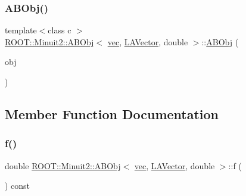 \mbox{\label{classROOT_1_1Minuit2_1_1ABObj_3_01vec_00_01LAVector_00_01double_01_4_aeb6018846b4e8252a64eb21db982fe96}} 
\subsubsection{\texorpdfstring{ABObj()}{ABObj()}\hspace{0.1cm}{\footnotesize\ttfamily [6/6]}}
{\footnotesize\ttfamily template$<$class c $>$ \\
\mbox{\hyperlink{classROOT_1_1Minuit2_1_1ABObj}{R\+O\+O\+T\+::\+Minuit2\+::\+A\+B\+Obj}}$<$ \mbox{\hyperlink{classROOT_1_1Minuit2_1_1vec}{vec}}, \mbox{\hyperlink{classROOT_1_1Minuit2_1_1LAVector}{L\+A\+Vector}}, double $>$\+::\mbox{\hyperlink{classROOT_1_1Minuit2_1_1ABObj}{A\+B\+Obj}} (\begin{DoxyParamCaption}\item[{const \mbox{\hyperlink{classROOT_1_1Minuit2_1_1ABObj}{A\+B\+Obj}}$<$ \mbox{\hyperlink{classROOT_1_1Minuit2_1_1vec}{vec}}, \mbox{\hyperlink{classROOT_1_1Minuit2_1_1LAVector}{L\+A\+Vector}}, c $>$ \&}]{obj }\end{DoxyParamCaption})\hspace{0.3cm}{\ttfamily [inline]}}



\subsection{Member Function Documentation}
\mbox{\label{classROOT_1_1Minuit2_1_1ABObj_3_01vec_00_01LAVector_00_01double_01_4_a418f4c2409e7afb1804e3033a7aed2fd}} 
\subsubsection{\texorpdfstring{f()}{f()}\hspace{0.1cm}{\footnotesize\ttfamily [1/2]}}
{\footnotesize\ttfamily double \mbox{\hyperlink{classROOT_1_1Minuit2_1_1ABObj}{R\+O\+O\+T\+::\+Minuit2\+::\+A\+B\+Obj}}$<$ \mbox{\hyperlink{classROOT_1_1Minuit2_1_1vec}{vec}}, \mbox{\hyperlink{classROOT_1_1Minuit2_1_1LAVector}{L\+A\+Vector}}, double $>$\+::f (\begin{DoxyParamCaption}{ }\end{DoxyParamCaption}) const\hspace{0.3cm}{\ttfamily [inline]}}

